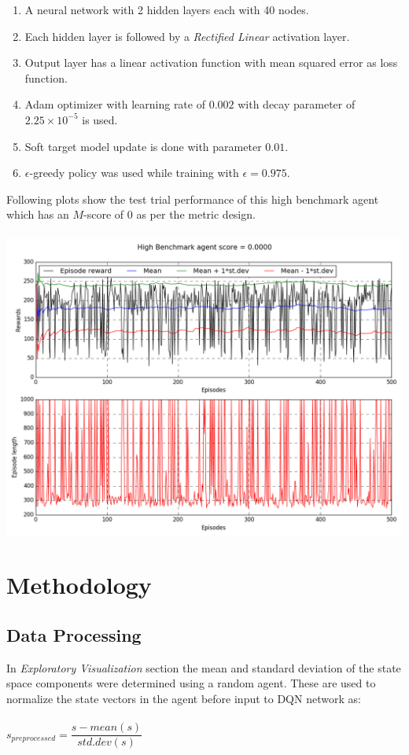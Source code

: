 \documentclass{article}
\begin{document}
\vspace{-0.1cm}
\begin{enumerate}
	\item A neural network with 2 hidden layers each with 40 nodes.
	\item Each hidden layer is followed by a \textit{Rectified Linear} activation layer.
	\item Output layer has a linear activation function with mean squared error as loss function.
	\item Adam optimizer with learning rate of $0.002$ with decay parameter of $2.25\times10^{-5}$ is used.
	\item Soft target model update is done with parameter $0.01$.
	\item $\epsilon$-greedy policy was used while training with $\epsilon = 0.975$.
\end{enumerate}
Following plots show the test trial performance of this high benchmark agent which has an $M$-score of $0$ as per the metric design.\\\\
\includegraphics[width=15cm,trim={0 0 0 0},clip]{img/highbenchmark_test_evaluation}\\
\section{Methodology}
\subsection*{Data Processing}
In \textit{Exploratory Visualization} section the mean and standard deviation of the state space components were determined using a random agent. These are used to normalize the state vectors in the agent before input to DQN network as:\\\\
$s_{preprocessed} = \dfrac{s - mean(s)}{std.dev(s)}$
\end{document}
